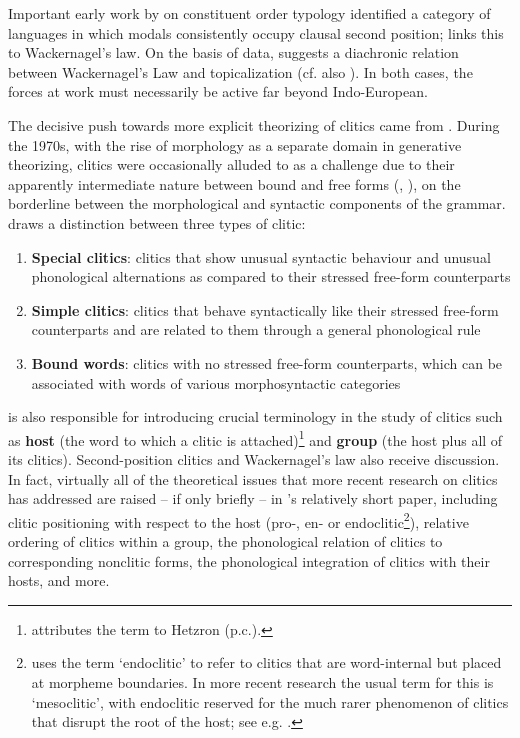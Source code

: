 Important early work by \citet{Steele1975} on constituent order typology identified a category of languages in which modals consistently occupy clausal second position; \citeauthor{Steele1975} links this to Wackernagel's law. On the basis of  data, \citet{Steele1977} suggests a diachronic relation between Wackernagel's Law and topicalization (cf. also \citealp{Hock1982}). In both cases, the forces at work must necessarily be active far beyond Indo-European. 

The decisive push towards more explicit theorizing of clitics came from \citet{Zwicky1977}. During the 1970s, with the rise of morphology as a separate domain in generative theorizing, clitics were occasionally alluded to as a challenge due to their apparently intermediate nature between bound and free forms (\citealp[166--169]{Matthews1974}, \citealp[3-4]{Aronoff1976}), on the borderline between the morphological and syntactic components of the grammar. \citet{Zwicky1977} draws a distinction between three types of clitic:

\begin{enumerate}
    \item \textbf{Special clitics}: clitics that show unusual syntactic behaviour and unusual phonological alternations as compared to their stressed free-form counterparts
    \item \textbf{Simple clitics}: clitics that behave syntactically like their stressed free-form counterparts and are related to them through a general phonological rule
    \item \textbf{Bound words}: clitics with no stressed free-form counterparts, which can be associated with words of various morphosyntactic categories
\end{enumerate}

\citet[9]{Zwicky1977} is also responsible for introducing crucial terminology in the study of clitics such as \textbf{host} (the word to which a clitic is attached)\footnote{\citet[note 5]{Zwicky1977} attributes the term to Hetzron (p.c.).} and \textbf{group} (the host plus all of its clitics). Second-position clitics and Wackernagel's law also receive discussion. In fact, virtually all of the theoretical issues that more recent research on clitics has addressed are raised -- if only briefly -- in \citeauthor{Zwicky1977}'s relatively short paper, including clitic positioning with respect to the host (pro-, en- or endoclitic\footnote{\citeauthor{Zwicky1977} uses the term `endoclitic' to refer to clitics that are word-internal but placed at morpheme boundaries. In more recent research the usual term for this is `mesoclitic', with endoclitic reserved for the much rarer phenomenon of clitics that disrupt the root of the host; see e.g. \citet{Smith2013}.}), relative ordering of clitics within a group, the phonological relation of clitics to corresponding nonclitic forms, the phonological integration of clitics with their hosts, and more.

